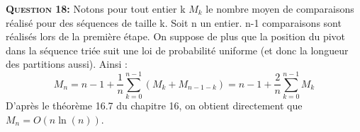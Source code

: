 \documentclass{article}
\begin{document}
\textsc{\bfseries Question 18:}
Notons pour tout entier k \(M_{k}\) le nombre moyen de comparaisons réalisé pour des séquences de taille k. Soit n un entier. n-1 comparaisons sont réalisés lors de la première étape. On suppose de plus que la position du pivot dans la séquence triée suit une loi de probabilité uniforme (et donc la longueur des partitions aussi). Ainsi : 
	\[M_{n} =n-1 + \frac{1}{n}\sum_{k=0}^{n-1}(M_{k}+M_{n-1-k})
		=n-1 + \frac{2}{n}\sum_{k=0}^{n-1}M_{k}\]
D'après le théorème 16.7 du chapitre 16, on obtient directement que \(M_{n}=O(n\ln(n))\).
\end{document}
